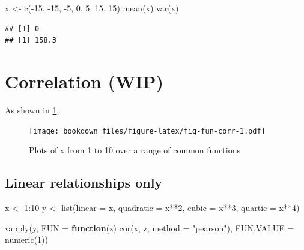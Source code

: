 \documentclass[
]{krantz}
\makeatletter
\newenvironment{Shaded}{\begin{snugshade}}{\end{snugshade}}
\newcommand{\AttributeTok}[1]{\textcolor[rgb]{0.61,0.61,0.61}{#1}}
\newcommand{\ControlFlowTok}[1]{\textcolor[rgb]{0.27,0.27,0.27}{\textbf{#1}}}
\newcommand{\DecValTok}[1]{\textcolor[rgb]{0.06,0.06,0.06}{#1}}
\newcommand{\FunctionTok}[1]{\textcolor[rgb]{0,0,0}{#1}}
\newcommand{\NormalTok}[1]{#1}
\newcommand{\OtherTok}[1]{\textcolor[rgb]{0.37,0.37,0.37}{#1}}
\newcommand{\SpecialCharTok}[1]{\textcolor[rgb]{0,0,0}{#1}}
\newcommand{\StringTok}[1]{\textcolor[rgb]{0.5,0.5,0.5}{#1}}
\newenvironment{kframe}{%
\medskip{}
\setlength{\fboxsep}{.8em}
 \def\at@end@of@kframe{}%
 \ifinner\ifhmode%
  \def\at@end@of@kframe{\end{minipage}}%
  \begin{minipage}{\columnwidth}%
 \fi\fi%
 \def\FrameCommand##1{\hskip\@totalleftmargin \hskip-\fboxsep
 \colorbox{shadecolor}{##1}\hskip-\fboxsep
     \hskip-\linewidth \hskip-\@totalleftmargin \hskip\columnwidth}%
 \MakeFramed {\advance\hsize-\width
   \@totalleftmargin\z@ \linewidth\hsize
   \@setminipage}}%
 {\par\unskip\endMakeFramed%
 \at@end@of@kframe}
\renewenvironment{Shaded}{\begin{kframe}}{\end{kframe}}
\makeatother
\begin{document}
\begin{Shaded}
\begin{Highlighting}[]
\NormalTok{x }\OtherTok{\textless{}{-}} \FunctionTok{c}\NormalTok{(}\SpecialCharTok{{-}}\DecValTok{15}\NormalTok{, }\SpecialCharTok{{-}}\DecValTok{15}\NormalTok{, }\SpecialCharTok{{-}}\DecValTok{5}\NormalTok{, }\DecValTok{0}\NormalTok{, }\DecValTok{5}\NormalTok{, }\DecValTok{15}\NormalTok{, }\DecValTok{15}\NormalTok{)}
\FunctionTok{mean}\NormalTok{(x)}
\FunctionTok{var}\NormalTok{(x)}
\end{Highlighting}
\end{Shaded}

\begin{verbatim}
## [1] 0
## [1] 158.3
\end{verbatim}

\hypertarget{correlation-wip}{%
\section{Correlation (WIP)}\label{correlation-wip}}

As shown in \ref{fig:fig-fun-corr},

\begin{figure}
\centering
\texttt{[image: bookdown\_files/figure-latex/fig-fun-corr-1.pdf]}
\caption{\label{fig:fig-fun-corr}Plots of x from 1 to 10 over a range of common functions}
\end{figure}

\hypertarget{linear-relationships-only}{%
\subsection{Linear relationships only}\label{linear-relationships-only}}

\begin{Shaded}
\begin{Highlighting}[]
\NormalTok{x }\OtherTok{\textless{}{-}} \DecValTok{1}\SpecialCharTok{:}\DecValTok{10}
\NormalTok{y }\OtherTok{\textless{}{-}} \FunctionTok{list}\NormalTok{(}\AttributeTok{linear =}\NormalTok{ x, }\AttributeTok{quadratic =}\NormalTok{ x}\SpecialCharTok{**}\DecValTok{2}\NormalTok{, }\AttributeTok{cubic =}\NormalTok{ x}\SpecialCharTok{**}\DecValTok{3}\NormalTok{, }\AttributeTok{quartic =}\NormalTok{ x}\SpecialCharTok{**}\DecValTok{4}\NormalTok{)}

\FunctionTok{vapply}\NormalTok{(y, }\AttributeTok{FUN =} \ControlFlowTok{function}\NormalTok{(z) }\FunctionTok{cor}\NormalTok{(x, z, }\AttributeTok{method =} \StringTok{"pearson"}\NormalTok{), }\AttributeTok{FUN.VALUE =} \FunctionTok{numeric}\NormalTok{(}\DecValTok{1}\NormalTok{))}
\end{Highlighting}
\end{Shaded}
\end{document}
